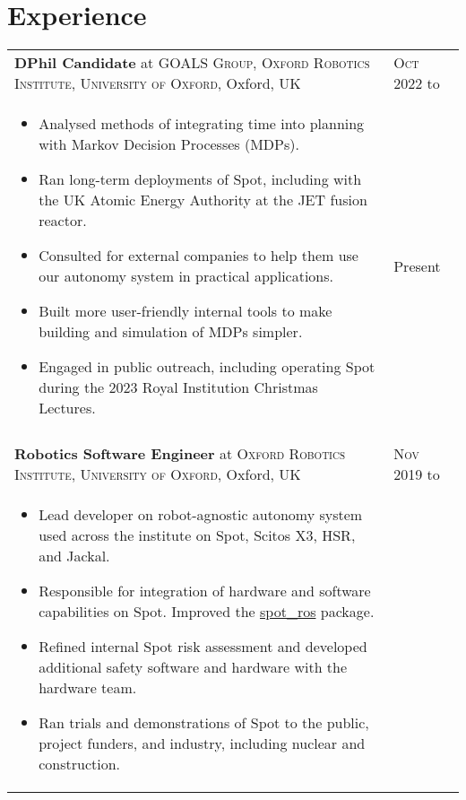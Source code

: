 \documentclass[a4paper,10pt]{article}
\newcommand{\datelen}{1.8cm}
\newcommand{\descrlen}{15.5cm}
\begin{document}
\section{Experience}
\begin{tabular}{p{\descrlen}|p{\datelen}}
  \textbf{DPhil Candidate} at \textsc{GOALS Group, Oxford Robotics Institute, University of Oxford}, Oxford, UK& \textsc{Oct 2022} to\\
  \small{
  \vspace{-0.4cm}
  \begin{itemize}
    \item Analysed methods of integrating time into planning with Markov Decision Processes (MDPs).
    \item Ran long-term deployments of Spot, including with the UK Atomic Energy Authority at the JET fusion reactor.
    \item Consulted for external companies to help them use our autonomy system in practical applications.
    \item Built more user-friendly internal tools to make building and simulation of MDPs simpler.
    \item Engaged in public outreach, including operating Spot during the 2023 Royal Institution Christmas Lectures.
    \vspace{-0.5cm}
  \end{itemize}
  }& Present
  \\
  \multicolumn{2}{c}{}\\[-0.2cm]
  \textbf{Robotics Software Engineer} at \textsc{Oxford Robotics Institute, University of Oxford}, Oxford, UK&\textsc{Nov 2019} to\\
  \small{
  \vspace{-0.4cm}
  \begin{itemize}
    \item Lead developer on robot-agnostic autonomy system used across the institute on Spot, Scitos X3, HSR, and Jackal.
    \item Responsible for integration of hardware and software capabilities on Spot. Improved the \href{https://github.com/clearpathrobotics/spot_ros}{spot\_ros} package.
    \item Refined internal Spot risk assessment and developed additional safety software and hardware  with the hardware team.
    \item Ran trials and demonstrations of Spot to the public, project funders, and industry, including nuclear and construction.

\end{itemize}}
\end{tabular}
\end{document}
